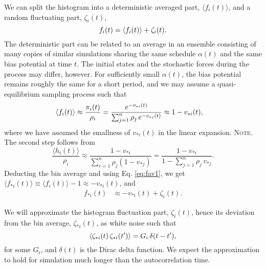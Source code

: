 \documentclass[preprint, superscriptaddress, floatfix]{revtex4-1}
\newcommand{\note}[1]{{\color{DarkGreen}\footnotesize \textsc{Note.} #1}}
\begin{document}
We can split the histogram into
a deterministic averaged part, $\langle f_i(t) \rangle$,
and a random fluctuating part, $\zeta_i(t)$,
%
\begin{equation}
  f_i(t) =
  \langle f_i(t) \rangle
  +
  \zeta_i(t)
  .
  \notag
\end{equation}
%
The deterministic part can be related
to an average in an ensemble consisting of
many copies of similar simulations
sharing the same schedule $\alpha(t)$
and the same bias potential at time $t$.
%
The initial states and the stochastic forces
during the process may differ, however.
%
For sufficiently small $\alpha(t)$,
the bias potential remains roughly the same for a short period,
and we may assume a quasi-equilibrium sampling process
such that
%
\begin{align}
  \langle f_i(t) \rangle
  &\approx
  \frac{ \pi_i(t) } { \rho_i }
  =
  \frac{                          e^{-v_{*i}(t)} }
       { \sum_{j = 1}^n \rho_j \, e^{-v_{*j}(t)} }
  \approx
  1 - v_{*i}(t)
  ,
  \notag
\end{align}
%
where we have assumed the smallness
of $v_{*i}(t)$ in the linear expansion.
%
\note{
The second step follows from
$$
\frac{ \langle h_i(t) \rangle }
     { \rho_i }
\approx
\frac{                       1 - v_{*i}  }
     { \sum_{ r = 1 }^n \rho_j (1 - v_{*j}) }
=
\frac{                       1 - v_{*i}  }
     { 1 - \sum_{ j = 1 }^n \rho_j \, v_{*j} }
.
$$
}%
%
Deducting the bin average and using Eq. \eqref{eq:fav1}, we get
$\langle f_{*i}(t) \rangle \equiv \langle f_i(t) \rangle - 1 \approx - v_{*i}(t)$,
and
%
\begin{align}
  f_{*i}(t)
  &\approx
  - v_{*i}(t)
  +
  \zeta_i(t)
  .
  \label{eq:sh_ave}
\end{align}


We will approximate the histogram fluctuation part, $\zeta_i(t)$,
hence its deviation from the bin average, $\zeta_{*i}(t)$,
as white noise such that
\begin{equation}
  \langle \zeta_{*i}(t) \, \zeta_{*i}(t') \rangle
  = G_i \, \delta(t - t')
  ,
  \notag
\end{equation}
for some $G_i$,
and $\delta(t)$ is the Dirac delta function.
%
We expect the approximation to hold for simulation
much longer than the autocorrelation time.
\end{document}
